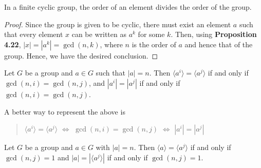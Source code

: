 \begin{corollary}
	In a finite cyclic group, the order of an element divides the order of the group.
\end{corollary}
\begin{proof}
	Since the group is given to be cyclic, there must exist an element $a$ such that every element $x$ can be written as $a^k$ for some $k$. Then, using \textbf{Proposition 4.22}, $|x|=|a^k|=\gcd(n,k)$, where $n$ is the order of $a$ and hence that of the group. Hence, we have the desired conclusion.
\end{proof}

\begin{corollary}
	Let $G$ be a group and $a\in G$ such that $|a|=n$. Then $\langle a^i\rangle=\langle a^j\rangle$ if and only if $\gcd(n,i)=\gcd(n,j)$, and $|a^i|=|a^j|$ if and only if $\gcd(n,i)=\gcd(n,j)$. 
\end{corollary}
A better way to represent the above is 
\begin{quote}
	$\langle a^i\rangle=\langle a^j\rangle$ $\Longleftrightarrow$ $\gcd(n,i)=\gcd(n,j)$ $\Longleftrightarrow$ $|a^i|=|a^j|$
\end{quote}

\begin{corollary}
	Let $G$ be a group and $a\in G$ with $|a|=n$. Then $\langle a\rangle= \langle a^j\rangle$ if and only if $\gcd(n,j)=1$ and $|a|=|\langle a^j\rangle|$ if and only if $\gcd(n,j)=1$.
\end{corollary}

